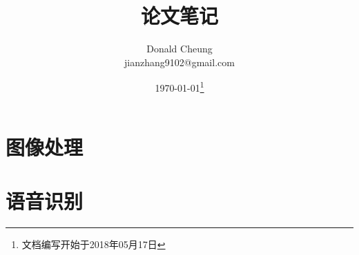 \def\papersnotes{}
\ifx\notes\undefined
    \providecommand{\notesroot}{..}
    \providecommand{\papersroot}{.}

    \title{论文笔记}
    \author{Donald Cheung\\jianzhang9102@gmail.com}
    \date{\today\footnote{文档编写开始于2018年05月17日}}

    
\else
    \providecommand{\papersroot}{\notesroot/papers}
\fi





\chapter{图像处理}

\chapter{语音识别}

\ifx\notes\undefined
    
\fi
